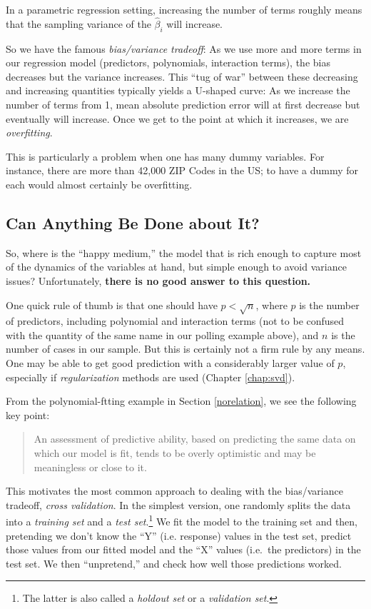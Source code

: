 In a parametric regression setting, increasing the number of terms
roughly means that the sampling variance of the $\widehat{\beta}_i$ will
increase.

So we have the famous \textit{bias/variance tradeoff}:  As we use more and
more terms in our regression model (predictors, polynomials, interaction
terms), the bias decreases but the variance increases.  This ``tug of
war'' between these decreasing and increasing quantities typically
yields a U-shaped curve:  As we increase the number of terms from 1,
mean absolute prediction error will at first decrease but eventually
will increase.  Once we get to the point at which it increases, we are
\textit{overfitting}.

This is particularly a problem when one has many dummy variables. For
instance, there are more than 42,000 ZIP Codes in the US; to have a
dummy for each would almost certainly be overfitting.

\subsection{Can Anything Be Done about It?}

So, where is the ``happy medium,'' the model that is rich enough to
capture most of the dynamics of the variables at hand, but simple enough
to avoid variance issues?  Unfortunately, \textbf{there is no good answer to
this question.}

One quick rule of thumb is that one should have $p < \sqrt{n}$, where
$p$ is the number of predictors, including polynomial and interaction
terms (not to be confused with the quantity of the same name in our
polling example above), and $n$ is the number of cases in our sample.
But this is certainly not a firm rule by any means.  One may be able to
get good prediction with a considerably larger value of $p$, especially
if \textit{regularization} methods are used (Chapter \ref{chap:svd}).

From the polynomial-ftting example in Section \ref{norelation}, we see
the following key point:

\begin{quote}
An assessment of predictive ability, based on predicting the same data
on which our model is fit, tends to be overly optimistic and may be
meaningless or close to it.
\end{quote}

This motivates the most common approach to dealing with the
bias/variance tradeoff, \textit{cross validation}.  In the simplest
version, one randomly splits the data into a \textit{training set} and a
\textit{test set}.\footnote{The latter is also called a \textit{holdout
set} or a \textit{validation set}.}  We fit the model to the training
set and then, pretending we don't know the ``Y'' (i.e. response) values
in the test set, predict those values from our fitted model and the
``X'' values (i.e.\ the predictors) in the test set.  We then
``unpretend,'' and check how well those predictions worked. 

